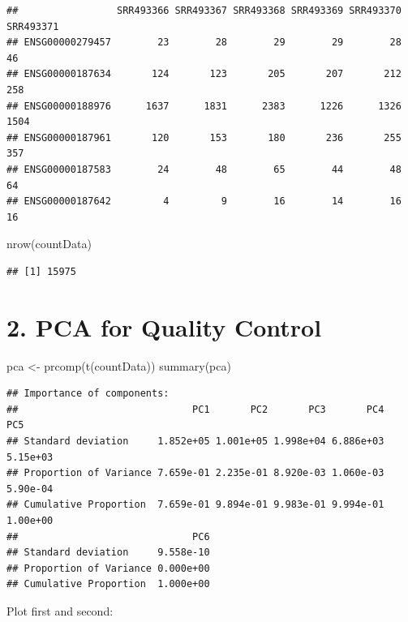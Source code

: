 \documentclass[
]{article}
\newenvironment{Shaded}{\begin{snugshade}}{\end{snugshade}}
\newcommand{\FunctionTok}[1]{\textcolor[rgb]{0.00,0.00,0.00}{#1}}
\newcommand{\NormalTok}[1]{#1}
\newcommand{\OtherTok}[1]{\textcolor[rgb]{0.56,0.35,0.01}{#1}}
\begin{document}
\begin{verbatim}
##                 SRR493366 SRR493367 SRR493368 SRR493369 SRR493370 SRR493371
## ENSG00000279457        23        28        29        29        28        46
## ENSG00000187634       124       123       205       207       212       258
## ENSG00000188976      1637      1831      2383      1226      1326      1504
## ENSG00000187961       120       153       180       236       255       357
## ENSG00000187583        24        48        65        44        48        64
## ENSG00000187642         4         9        16        14        16        16
\end{verbatim}

\begin{Shaded}
\begin{Highlighting}[]
\FunctionTok{nrow}\NormalTok{(countData)}
\end{Highlighting}
\end{Shaded}

\begin{verbatim}
## [1] 15975
\end{verbatim}

\hypertarget{pca-for-quality-control}{%
\section{2. PCA for Quality Control}\label{pca-for-quality-control}}

\begin{Shaded}
\begin{Highlighting}[]
\NormalTok{pca }\OtherTok{\textless{}{-}} \FunctionTok{prcomp}\NormalTok{(}\FunctionTok{t}\NormalTok{(countData))}
\FunctionTok{summary}\NormalTok{(pca)}
\end{Highlighting}
\end{Shaded}

\begin{verbatim}
## Importance of components:
##                              PC1       PC2       PC3       PC4      PC5
## Standard deviation     1.852e+05 1.001e+05 1.998e+04 6.886e+03 5.15e+03
## Proportion of Variance 7.659e-01 2.235e-01 8.920e-03 1.060e-03 5.90e-04
## Cumulative Proportion  7.659e-01 9.894e-01 9.983e-01 9.994e-01 1.00e+00
##                              PC6
## Standard deviation     9.558e-10
## Proportion of Variance 0.000e+00
## Cumulative Proportion  1.000e+00
\end{verbatim}

Plot first and second:
\end{document}
